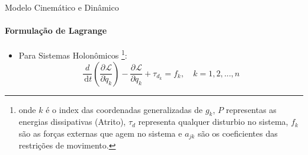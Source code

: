 \documentclass{beamer}
\newcommand{\df}[1]{\,\mathrm{d}#1}
\newcommand{\parcial}[3]{\dfrac{\partial^{#1}#2}{\partial #3^{#1}}}
\begin{document}
\begin{frame}{Modelo Cinemático e Dinâmico}
    \framesubtitle{Formulação de Lagrange}

    \begin{itemize}
        \item Para Sistemas Holonômicos \footnote{onde $k$ é o index das coordenadas generalizadas de $g_k$, $P$ representas as energias dissipativas (Atrito),
        $\tau_d$ representa qualquer disturbio no sistema, $f_k$ são as forças externas que agem no sistema e $a_{jk}$ são os coeficientes das restrições de movimento.}:
              \begin{equation}
                  \frac{d}{\df{t}}\left( \parcial{}{\mathcal{L}}{\dot{q}_k}\right)
                  -\parcial{}{\mathcal{L}}{q_k}
                  +\tau_{d_k}
                  = f_k, \quad k = 1,2,...,n
              \end{equation}

    \end{itemize}
\end{frame}



\end{document}
